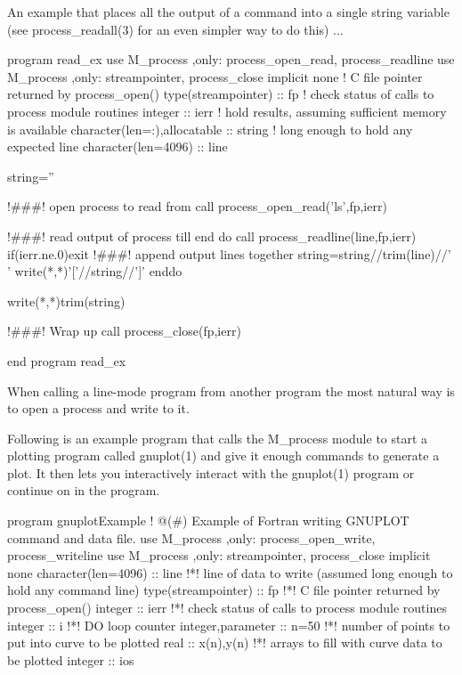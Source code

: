 \begin{DoxyVerb}An example that places all the output of a command into a single
string variable (see process_readall(3) for an even simpler way to
do this) ...

   program read_ex
   use M_process ,only: process_open_read, process_readline
   use M_process ,only: streampointer, process_close
   implicit none
   ! C file pointer returned by process_open()
   type(streampointer) :: fp
   ! check status of calls to process module routines
   integer :: ierr
   ! hold results, assuming sufficient memory is available
   character(len=:),allocatable :: string
   ! long enough to hold any expected line
   character(len=4096) :: line

      string=''

      !###! open process to read from
      call process_open_read('ls',fp,ierr)

      !###! read output of process till end
      do
         call process_readline(line,fp,ierr)
         if(ierr.ne.0)exit
         !###! append output lines together
         string=string//trim(line)//' '
         write(*,*)'['//string//']'
      enddo

      write(*,*)trim(string)

      !###! Wrap up
      call process_close(fp,ierr)

   end program read_ex

When calling a line-mode program from another program the most natural
way is to open a process and write to it.

Following is an example program that calls the M_process module to
start a plotting program called gnuplot(1) and give it enough commands
to generate a plot. It then lets you interactively interact with the
gnuplot(1) program or continue on in the program.

 program gnuplotExample
 ! @(#)  Example of Fortran writing GNUPLOT command and data file.
 use M_process ,only: process_open_write, process_writeline
 use M_process ,only: streampointer, process_close
 implicit none
 character(len=4096) :: line                             !*! line of data to write (assumed long enough to hold any command line)
 type(streampointer) :: fp                               !*! C file pointer returned by process_open()
 integer :: ierr                                         !*! check status of calls to process module routines
 integer :: i                                            !*! DO loop counter
 integer,parameter   :: n=50                             !*! number of points to put into curve to be plotted
 real                :: x(n),y(n)                        !*! arrays to fill with curve data to be plotted
 integer             :: ios


\end{DoxyVerb}
